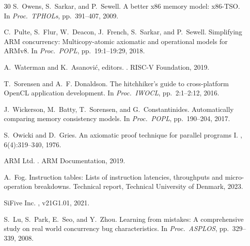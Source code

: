 \documentclass[11pt]{article}
\begin{document}
\begin{thebibliography}{30}
S.~Owens, S.~Sarkar, and P.~Sewell.
\newblock A better x86 memory model: x86-{TSO}.
\newblock In {\em Proc.\ TPHOLs}, pp.\ 391--407, 2009.

C.~Pulte, S.~Flur, W.~Deacon, J.~French, S.~Sarkar, and P.~Sewell.
\newblock Simplifying {ARM} concurrency: Multicopy-atomic axiomatic and
  operational models for {ARMv8}.
\newblock In {\em Proc.\ POPL}, pp.\ 19:1--19:29, 2018.

A.~Waterman and K.~Asanovi{\'c}, editors.
.
\newblock RISC-V Foundation, 2019.

T.~Sorensen and A.~F. Donaldson.
\newblock The hitchhiker's guide to cross-platform {OpenCL} application development.
\newblock In {\em Proc.\ IWOCL}, pp.\ 2:1--2:12, 2016.

J.~Wickerson, M.~Batty, T.~Sorensen, and G.~Constantinides.
\newblock Automatically comparing memory consistency models.
\newblock In {\em Proc.\ POPL}, pp.\ 190--204, 2017.

S.~Owicki and D.~Gries.
\newblock An axiomatic proof technique for parallel programs {I}.
, 6(4):319--340, 1976.

ARM Ltd.
.
\newblock ARM Documentation, 2019.

A.~Fog.
\newblock Instruction tables: Lists of instruction latencies,
throughputs and micro-operation breakdowns.
\newblock Technical report, Technical University of Denmark, 2023.

SiFive Inc.
, v21G1.01, 2021.

S.~Lu, S.~Park, E.~Seo, and Y.~Zhou.
\newblock Learning from mistakes: A comprehensive study on real world
  concurrency bug characteristics.
\newblock In {\em Proc.\ ASPLOS}, pp.\ 329--339, 2008.

\end{thebibliography}

\clearpage
\appendix

\end{document}
